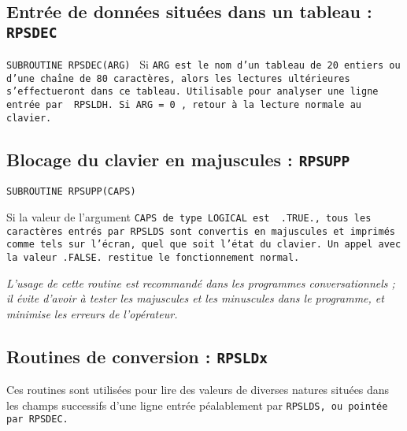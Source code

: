 \documentclass[a4paper,12pt,titlepage]{article}
\newcommand{\fsub}[1]{\hbox {\tt SUBROUTINE #1  } \medskip }
\begin{document}
\subsection{Entr\'ee de donn\'ees situ\'ees dans un tableau : \tt RPSDEC}
\fsub{RPSDEC(ARG)}
                   Si \tt ARG\rm\ est le nom d'un tableau de 20
		   entiers ou d'une cha\^{\i}ne de 80 caract\`eres, alors les
		   lectures ult\'erieures s'effectueront dans ce tableau.
		   Utilisable pour analyser une ligne entr\'ee par \tt
                   RPSLDH\rm.
		   Si \tt ARG\rm\ = 0 , retour \`a la lecture normale au clavier.

\subsection{Blocage du clavier en majuscules : \tt RPSUPP}
\fsub{   RPSUPP(CAPS)}

Si la valeur de l'argument \tt CAPS\rm\ de type \tt LOGICAL\rm\ est \tt
.TRUE.\rm, tous les caract\`eres entr\'es par \tt RPSLDS\rm\ sont convertis
en majuscules et imprim\'es comme tels sur l'\'ecran, quel que soit l'\'etat
du clavier. Un appel avec la valeur \tt .FALSE.\rm\ restitue le
fonctionnement normal.

\em L'usage de cette routine est recommand\'e dans les programmes
conversationnels ; il \'evite d'avoir \`a tester les majuscules et les
minuscules dans le programme, et minimise les erreurs de l'op\'erateur.\em

\subsection{Routines de conversion : \tt RPSLDx}

Ces routines sont utilis\'ees pour lire des valeurs de diverses natures
situ\'ees dans les champs successifs d'une ligne entr\'ee p\'ealablement par
\tt RPSLDS\rm, ou point\'ee par \tt RPSDEC\rm.
\end{document}
